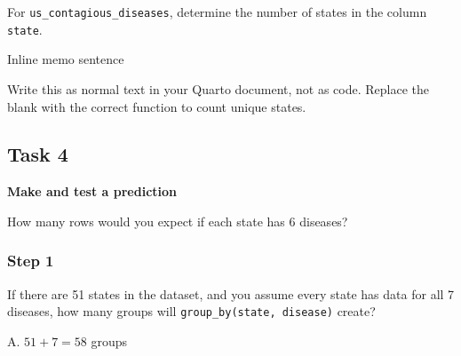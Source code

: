\documentclass[
]{article}
\newenvironment{Shaded}{\begin{snugshade}}{\end{snugshade}}
\newcommand{\AttributeTok}[1]{\textcolor[rgb]{0.13,0.29,0.53}{#1}}
\newcommand{\CommentTok}[1]{\textcolor[rgb]{0.56,0.35,0.01}{\textit{#1}}}
\newcommand{\DocumentationTok}[1]{\textcolor[rgb]{0.56,0.35,0.01}{\textbf{\textit{#1}}}}
\newcommand{\FunctionTok}[1]{\textcolor[rgb]{0.13,0.29,0.53}{\textbf{#1}}}
\newcommand{\NormalTok}[1]{#1}
\newcommand{\SpecialCharTok}[1]{\textcolor[rgb]{0.81,0.36,0.00}{\textbf{#1}}}
\newcommand{\StringTok}[1]{\textcolor[rgb]{0.31,0.60,0.02}{#1}}
\begin{document}
For \texttt{us\_contagious\_diseases}, determine the number of states in
the column \texttt{state}.

\begin{Shaded}
\end{Shaded}

Inline memo sentence

Write this as normal text in your Quarto document, not as code. Replace
the blank with the correct function to count unique states.

\begin{Shaded}
\end{Shaded}

\subsection{Task 4}\label{task-4}

\textbf{Make and test a prediction}

How many rows would you expect if each state has 6 diseases?

\subsubsection{Step 1}\label{step-1}

If there are 51 states in the dataset, and you assume every state has
data for all 7 diseases, how many groups will
\texttt{group\_by(state,\ disease)} create?

A. \(51 + 7 = 58\) groups
\end{document}
